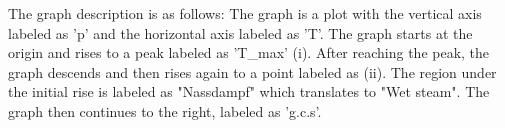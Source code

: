 The graph description is as follows: The graph is a plot with the vertical axis labeled as 'p' and the horizontal axis labeled as 'T'. The graph starts at the origin and rises to a peak labeled as 'T_max' (i). After reaching the peak, the graph descends and then rises again to a point labeled as (ii). The region under the initial rise is labeled as "Nassdampf" which translates to "Wet steam". The graph then continues to the right, labeled as 'g.c.s'.